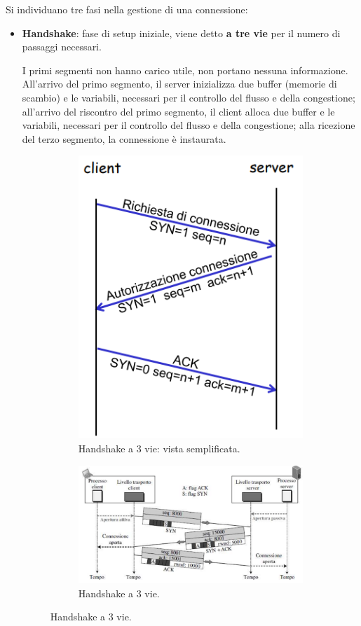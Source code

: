 \documentclass[11pt, italian, openany]{book}
\begin{document}
\begin{sloppypar}
\begin{itemize}[topsep=0pt]
	Si individuano tre fasi nella gestione di una connessione:
	\vspace{-3.5mm}
	\begin{itemize}
		\itemsep-0.3em
		\item \textbf{Handshake}: fase di setup iniziale, viene detto \textbf{a tre vie} per il numero di passaggi necessari.
		
		I primi segmenti non hanno carico utile, non portano nessuna informazione. All'arrivo del primo segmento, il server inizializza due buffer (memorie di
		scambio) e le variabili, necessari per il controllo del flusso e della congestione; all'arrivo del riscontro del primo segmento, il client alloca due
		buffer e le variabili, necessari per il controllo del flusso e della congestione; alla ricezione del terzo segmento, la connessione \`e instaurata.

		\begin{figure}[h!]
			\begin{subfigure}{0.49 \linewidth} \centering
				\includegraphics[scale=0.3]{images/tcp-3way-handshake-semplificato.png}
				\caption{Handshake a 3 vie: vista semplificata.}
			\end{subfigure}
			\begin{subfigure}{0.49 \linewidth} \centering
				\includegraphics[scale=0.265]{images/tcp-3way-handshake.png}
				\caption{Handshake a 3 vie.}
			\end{subfigure}
		\end{figure}


\end{itemize}
\end{itemize}
\end{sloppypar}
\end{document}

